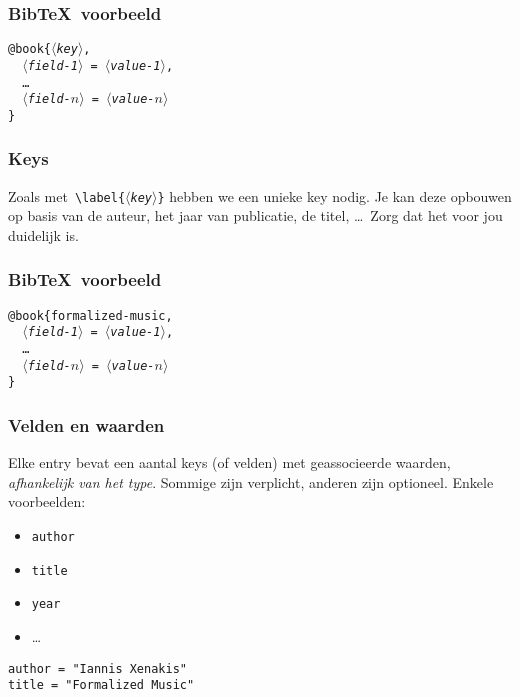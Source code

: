 \begin{frame}
  \frametitle{Bib\TeX\ voorbeeld}

\texttt{@book\{\textsl{$\langle$key$\rangle$},\\
\ \ \textsl{$\langle$field-1$\rangle$} = \textsl{$\langle$value-1$\rangle$}, \\
\ \ \ldots \\
\ \ \textsl{$\langle$field-$n\rangle$} = \textsl{$\langle$value-$n\rangle$} \\
\}}
\end{frame}

\begin{frame}
  \frametitle{Keys}

  Zoals met~\texttt{\textbackslash label\{\textsl{$\langle$key$\rangle$}\}} hebben we een unieke key nodig. Je kan deze opbouwen op basis van de auteur, het jaar van publicatie, de titel, \ldots\ Zorg dat het voor jou duidelijk is.
\end{frame}

\begin{frame}
  \frametitle{Bib\TeX\ voorbeeld}

\texttt{{@}book\{formalized-music,\\
\ \ \textsl{$\langle$field-1$\rangle$} = \textsl{$\langle$value-1$\rangle$}, \\
\ \ \ldots \\
\ \ \textsl{$\langle$field-$n\rangle$} = \textsl{$\langle$value-$n\rangle$} \\
\}}
\end{frame}

\begin{frame}[fragile]
  \frametitle{Velden en waarden}

  Elke entry bevat een aantal keys (of velden) met geassocieerde waarden, \emph{afhankelijk van het type}. Sommige zijn verplicht, anderen zijn optioneel. Enkele voorbeelden:
  \begin{itemize}
	\item \texttt{author}
	\item \texttt{title}
	\item \texttt{year}
	\item \ldots
  \end{itemize}
  \verb|author = "Iannis Xenakis"| \\
  \verb|title = "Formalized Music"|
\end{frame}

